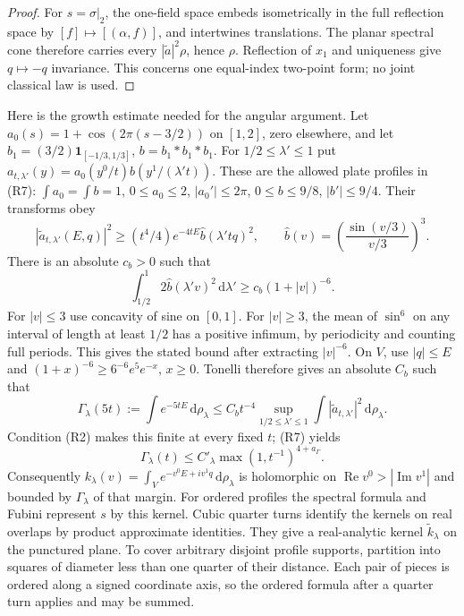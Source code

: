 \documentclass[11pt,letterpaper,reqno]{amsart}
\theoremstyle{definition}
\theoremstyle{remark}
\begin{document}
\begin{proof}
For $s=\sigma|_2$, the one-field space embeds isometrically
in the full reflection space by $[f]\mapsto[(\alpha,f)]$,
and intertwines translations. The planar spectral cone
therefore carries every $|\widetilde a|^2\rho$, hence $\rho$.
Reflection of $x_1$ and uniqueness give $q\mapsto-q$
invariance. This concerns one equal-index two-point form;
no joint classical law is used.
\end{proof}

Here is the growth estimate needed for the angular argument.
Let $a_0(s)=1+\cos(2\pi(s-3/2))$ on $[1,2]$, zero
elsewhere, and let
$b_1=(3/2)\mathbf1_{[-1/3,1/3]}$, $b=b_1*b_1*b_1$.
For $1/2\le\lambda'\le1$ put
$a_{t,\lambda'}(y)=a_0(y^0/t)b(y^1/(\lambda't))$.
These are the allowed plate profiles in (R7):
$\int a_0=\int b=1$, $0\le a_0\le2$,
$|a_0'|\le2\pi$, $0\le b\le9/8$, $|b'|\le9/4$.
Their transforms obey
\[
 |\widetilde a_{t,\lambda'}(E,q)|^2
       \ge(t^4/4)e^{-4tE}\widehat b(\lambda'tq)^2,
 \qquad\widehat b(v)=\left(\frac{\sin(v/3)}{v/3}\right)^3.
\]
There is an absolute $c_b>0$ such that
\[
 \int_{1/2}^1 2\widehat b(\lambda'v)^2\,\mathrm{d}\lambda'
                         \ge c_b(1+|v|)^{-6}.
\]
For $|v|\le3$ use concavity of sine on $[0,1]$.
For $|v|\ge3$, the mean of $\sin^6$ on any interval of
length at least $1/2$ has a positive infimum, by
periodicity and counting full periods. This gives the
stated bound after extracting $|v|^{-6}$.
On $V$, use $|q|\le E$ and
$(1+x)^{-6}\ge6^{-6}e^5e^{-x}$, $x\ge0$.
Tonelli therefore gives an absolute $C_b$ such that
\[
 \Gamma_\lambda(5t):=\int e^{-5tE}\,\mathrm{d}\rho_\lambda
 \le C_bt^{-4}\sup_{1/2\le\lambda'\le1}
               \int|\widetilde a_{t,\lambda'}|^2\,\mathrm{d}\rho_\lambda.
\]
Condition (R2) makes this finite at every fixed $t$;
(R7) yields
\begin{equation}\label{IV-33-54}
 \Gamma_\lambda(t)\le C'_{\lambda}
                              \max(1,t^{-1})^{4+a_\Gamma}.
\end{equation}
Consequently
$k_\lambda(v)=\int_Ve^{-v^0E+iv^1q}\,\mathrm{d}\rho_\lambda$
is holomorphic on $\operatorname{Re}v^0>|\operatorname{Im}v^1|$
and bounded by $\Gamma_\lambda$ of that margin.
For ordered profiles the spectral formula and Fubini
represent $s$ by this kernel. Cubic quarter turns identify
the kernels on real overlaps by product approximate
identities. They give a real-analytic kernel
$\widetilde k_\lambda$ on the punctured plane.
To cover arbitrary disjoint profile supports, partition
into squares of diameter less than one quarter of their
distance. Each pair of pieces is ordered along a signed
coordinate axis, so the ordered formula after a quarter
turn applies and may be summed.
\end{document}
